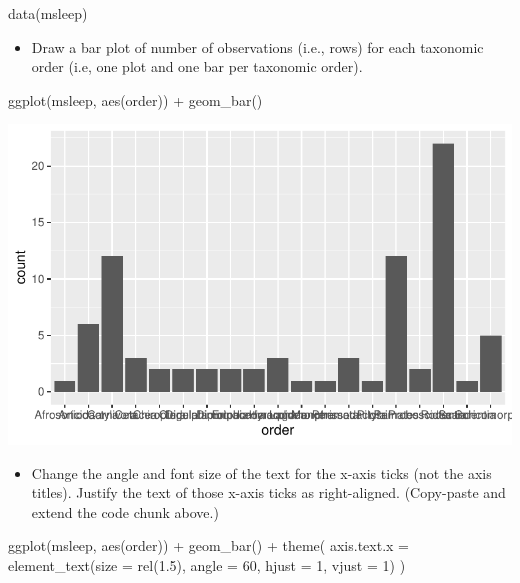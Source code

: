 \documentclass[
  letterpaper,
  DIV=11,
  numbers=noendperiod]{scrartcl}
\newenvironment{Shaded}{\begin{snugshade}}{\end{snugshade}}
\newcommand{\AttributeTok}[1]{\textcolor[rgb]{0.40,0.45,0.13}{#1}}
\newcommand{\DecValTok}[1]{\textcolor[rgb]{0.68,0.00,0.00}{#1}}
\newcommand{\FloatTok}[1]{\textcolor[rgb]{0.68,0.00,0.00}{#1}}
\newcommand{\FunctionTok}[1]{\textcolor[rgb]{0.28,0.35,0.67}{#1}}
\newcommand{\NormalTok}[1]{\textcolor[rgb]{0.00,0.23,0.31}{#1}}
\newcommand{\SpecialCharTok}[1]{\textcolor[rgb]{0.37,0.37,0.37}{#1}}
\providecommand{\tightlist}{%
  \setlength{\itemsep}{0pt}\setlength{\parskip}{0pt}}\usepackage{longtable,booktabs,array}
\begin{document}
\begin{Shaded}
\begin{Highlighting}[]
\FunctionTok{data}\NormalTok{(msleep)}
\end{Highlighting}
\end{Shaded}

\begin{itemize}
\tightlist
\item
  Draw a bar plot of number of observations (i.e., rows) for each
  taxonomic order (i.e, one plot and one bar per taxonomic order).
\end{itemize}

\begin{Shaded}
\begin{Highlighting}[]
\FunctionTok{ggplot}\NormalTok{(msleep, }\FunctionTok{aes}\NormalTok{(order)) }\SpecialCharTok{+}
  \FunctionTok{geom\_bar}\NormalTok{()}
\end{Highlighting}
\end{Shaded}

\includegraphics{5-ggplot2_kevin_files/figure-pdf/unnamed-chunk-17-1.pdf}

\begin{itemize}
\tightlist
\item
  Change the angle and font size of the text for the x-axis ticks (not
  the axis titles). Justify the text of those x-axis ticks as
  right-aligned. (Copy-paste and extend the code chunk above.)
\end{itemize}

\begin{Shaded}
\begin{Highlighting}[]
\FunctionTok{ggplot}\NormalTok{(msleep, }\FunctionTok{aes}\NormalTok{(order)) }\SpecialCharTok{+}
  \FunctionTok{geom\_bar}\NormalTok{() }\SpecialCharTok{+}
  \FunctionTok{theme}\NormalTok{(}
    \AttributeTok{axis.text.x =} \FunctionTok{element\_text}\NormalTok{(}\AttributeTok{size =} \FunctionTok{rel}\NormalTok{(}\FloatTok{1.5}\NormalTok{), }\AttributeTok{angle =} \DecValTok{60}\NormalTok{, }\AttributeTok{hjust =} \DecValTok{1}\NormalTok{, }\AttributeTok{vjust =} \DecValTok{1}\NormalTok{)}
\NormalTok{    )}
\end{Highlighting}
\end{Shaded}
\end{document}
